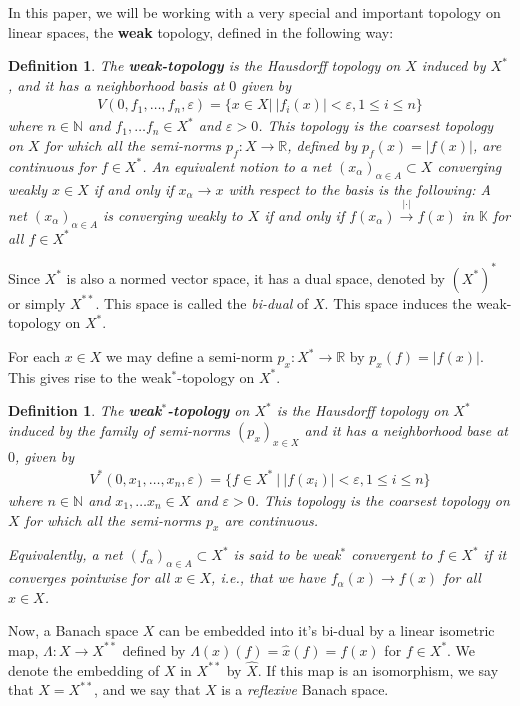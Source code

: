 \documentclass[10pt,twoside,openany,final]{memoir}
\theoremstyle{break}
\newtheorem{definition}[section]{Definition}
\theoremstyle{Break}
\newcommand{\R}{\mathbb{R}}
\newcommand{\N}{\mathbb{N}}
\begin{document}
	\noindent In this paper, we will be working with a very special and important topology on linear spaces, the \textbf{weak} topology, defined in the following way:
\begin{definition}
The \textbf{weak-topology} is the Hausdorff topology on $X$ induced by $X^*$, and it has a neighborhood basis at $0$ given by
\begin{align*}
V(0,f_{1},\dots,f_{n},\varepsilon)=\{ x \in X \big|\ |f_{i}(x)| < \varepsilon, 1 \leq i \leq n\}
\end{align*}
where $n \in \N$ and $f_{1}, \dots f_{n} \in X^*$ and $\varepsilon >0$. This topology is the coarsest topology on $X$ for which all the semi-norms $p_{f} \colon X \to \R$, defined by $p_{f}(x)=|f(x)|$, are continuous for $f \in X^*$.  
\noindent An equivalent notion to a net $(x_{\alpha})_{\alpha \in A} \subset X$ converging weakly $x \in X$ if and only if $x_{\alpha} \to x$ with respect to the basis is the following: A net $(x_{\alpha})_{\alpha \in A}$ is converging weakly to $X$ if and only if $f(x_{\alpha}) \stackrel{|\cdot|}{\to} f(x)$ in $\mathbb{K}$ for all $f \in X^*$
\end{definition}
	\noindent Since $X^*$ is also a normed vector space, it has a dual space, denoted by $(X^*)^*$ or simply $X^{**}$. This space is called the \emph{bi-dual} of $X$. This space induces the weak-topology on $X^*$.
	
\noindent For each $x \in X$ we may define a semi-norm $p_{x}:X^* \to \R$ by $p_{x}(f)=|f(x)|$. This gives rise to the weak$^*$-topology on $X^*$.
\begin{definition}
The \textbf{weak}$^*$\textbf{-topology} on $X^*$ is the Hausdorff topology on $X^*$ induced by the family of semi-norms $(p_{x})_{x \in X}$ and it has a neighborhood base at $0$, given by
\begin{align*}
V^*(0,x_{1},\dots,x_{n},\varepsilon)=\{ f \in X^*\ \big|\ |f(x_{i})| < \varepsilon, 1 \leq i \leq n\}
\end{align*}
where $n \in \N$ and $x_{1}, \dots x_{n} \in X$ and $\varepsilon >0$. This topology is the coarsest topology on $X$ for which all the semi-norms $p_{x}$ are continuous.

\noindent Equivalently, a net $(f_{\alpha})_{\alpha \in A} \subset X^*$ is said to be weak$^*$ convergent to $f \in X^*$ if it converges pointwise for all $x \in X$, i.e., that we have $f_{\alpha}(x) \to f(x)$ for all $x \in X$.
\end{definition}
\noindent Now, a Banach space $X$ can be embedded into it's bi-dual by a linear isometric map, $\Lambda:X \to X^{**}$ defined by $\Lambda(x)(f) = \hat{x}(f) =f(x)$ for $f \in X^*$. We denote the embedding of $X$ in $X^{**}$ by $\hat{X}$. If this map is an isomorphism, we say that $X=X^{**}$, and we say that $X$ is a \emph{reflexive} Banach space.
\end{document}
